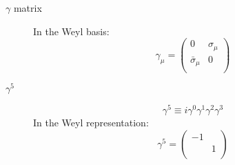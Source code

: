 \begin{description}
    \item [$\gamma$ matrix]
	In the Weyl basis:
	\[  \gamma_\mu = 
	    \begin{pmatrix}
		0   & \sigma_\mu    \\
		\bar{\sigma}_\mu  & 0	\\
	    \end{pmatrix} 
	\]
    \item [$\gamma^5$]
	\[
	    \gamma^5 \equiv i\gamma^0\gamma^1\gamma^2\gamma^3
	\]
	In the Weyl representation:
	\[
	    \gamma^5 = 
	    \begin{pmatrix}
		-\mathcal{1}	&   \\
		    & \mathcal{1}   \\
	    \end{pmatrix}
	\]
\end{description}
